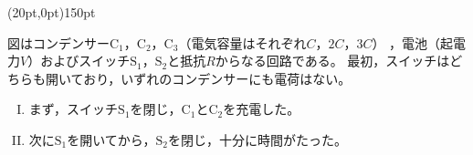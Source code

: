 \hakosyokika
\item
    \begin{mawarikomi}(20pt,0pt){150pt}{
        
        }
        図はコンデンサー$\mathrm{C_1}$，$\mathrm{C_2}$，$\mathrm{C_3}$（電気容量はそれぞれ$C$，$2C$，$3C$）
        ，電池（起電力$V$）およびスイッチ$\mathrm{S_1}$，$\mathrm{S_2}$と抵抗$R$からなる回路である。
        最初，スイッチはどちらも開いており，いずれのコンデンサーにも電荷はない。
        \begin{enumerate}[I.]
            \item まず，スイッチ$\mathrm{S_1}$を閉じ，$\mathrm{C_1}$と$\mathrm{C_2}$を充電した。
            \item 次に$\mathrm{S_1}$を開いてから，$\mathrm{S_2}$を閉じ，十分に時間がたった。
        \end{enumerate}
    \end{mawarikomi}
